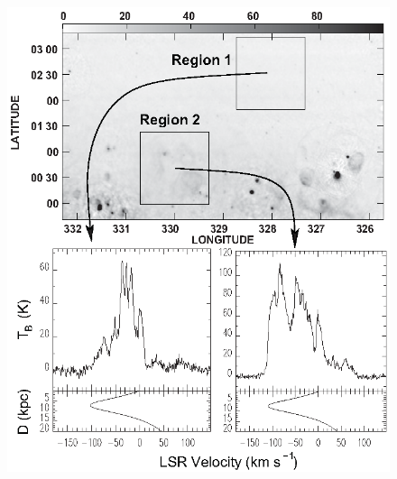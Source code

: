 \documentclass[12pt]{article}
\begin{document}
            \begin{figure}[hb]
              \centering
              \includegraphics[totalheight=80 mm]{img/Dickey2001_regions.eps}

\end{figure}
\end{document}
